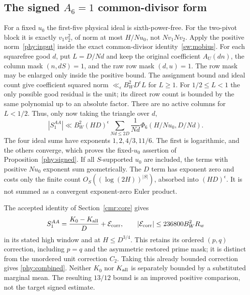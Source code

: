 \subsection{The signed $A_6=1$ common-divisor form}\label{phy:divisor-proof}
For a fixed $u_0$ the first-five physical ideal is sixth-power-free.
For the two-pivot block it is exactly $v_1v_2^2$, of norm at most
$H/Nu_0$, not $Nv_1Nv_2$. Apply the positive norm~\eqref{phy:input}
inside the exact common-divisor identity~\eqref{sw:mobius}.
For each squarefree good $d$, put $L=D/Nd$ and keep the original
coefficient $A_U(dn)$, the column mask $(n,dS)=1$, and the raw row mask
$(d,u)=1$. The row mask may be enlarged only inside the positive bound.
The assignment bound and ideal count give coefficient squared norm
$\ll_\epsilon B_W^2D^\epsilon L$ for $L\ge1$.
For $1/2\le L<1$ the only possible good residual is the unit; its direct
row count is bounded by the same polynomial up to an absolute factor.
There are no active columns for $L<1/2$.
Thus, only now taking the triangle over $d$,
\[
 |S_1^{AA}|\ll B_W^2(HD)^\epsilon
     \sum_{Nd\le2D}\frac1{Nd}\Phi_6(H/Nu_0,D/Nd).
\]
The four ideal sums have exponents $1,2,4/3,11/6$.
The first is logarithmic, and the others converge, which proves the
fixed-$u_0$ assertion of Proposition~\ref{phy:signed}.
If all $S$-supported $u_0$ are included, the terms with positive
$Nu_0$ exponent sum geometrically. The $D$ term has exponent zero
and costs only the finite count
$O_S((\log(2H))^{|S|})$, absorbed into $(HD)^\epsilon$.
It is not summed as a convergent exponent-zero Euler product.

The accepted identity of Section~\ref{cmr:core} gives
\[
 S_1^{AA}=\frac{K_0-K_{\rm all}}D+\mathcal E_{\rm corr},
 \qquad |\mathcal E_{\rm corr}|\le236800B_W^2R_w
\]
in its stated high window and at $H\le D^{3/4}$.
This retains its ordered $(p,q)$ correction, including $p=q$ and the
asymmetric restored prime mask; it is distinct from the unordered
unit correction $C_2$. Taking this already bounded correction gives
\eqref{phy:combined}. Neither $K_0$ nor $K_{\rm all}$ is separately
bounded by a substituted marginal mean. The resulting $13/12$ bound
is an improved positive comparison, not the target signed estimate.


